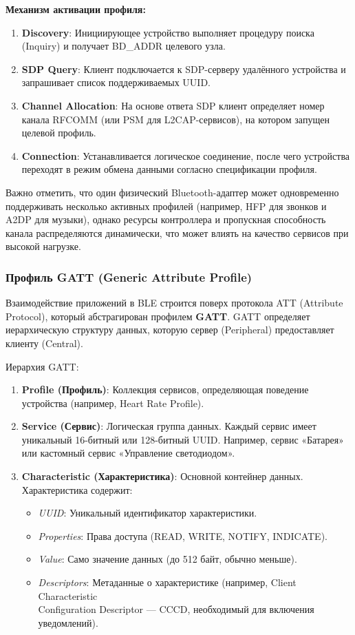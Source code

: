 \textbf{Механизм активации профиля:}
\begin{enumerate}[nosep]
    \item \textbf{Discovery}: Инициирующее устройство выполняет процедуру поиска (Inquiry) и получает BD\_ADDR целевого узла.
    \item \textbf{SDP Query}: Клиент подключается к SDP-серверу удалённого устройства и запрашивает список поддерживаемых UUID.
    \item \textbf{Channel Allocation}: На основе ответа SDP клиент определяет номер канала RFCOMM (или PSM для L2CAP-сервисов), на котором запущен целевой профиль.
    \item \textbf{Connection}: Устанавливается логическое соединение, после чего устройства переходят в режим обмена данными согласно спецификации профиля.
\end{enumerate}

Важно отметить, что один физический Bluetooth-адаптер может одновременно поддерживать несколько активных профилей (например, HFP для звонков и A2DP для музыки), однако ресурсы контроллера и пропускная способность канала распределяются динамически, что может влиять на качество сервисов при высокой нагрузке.

\subsubsection{Профиль GATT (Generic Attribute Profile)}
Взаимодействие приложений в BLE строится поверх протокола ATT (Attribute Protocol), который абстрагирован профилем \textbf{GATT}. GATT определяет иерархическую структуру данных, которую сервер (Peripheral) предоставляет клиенту (Central).

Иерархия GATT:
\begin{enumerate}[nosep]
    \item \textbf{Profile (Профиль)}: Коллекция сервисов, определяющая поведение устройства (например, Heart Rate Profile).
    \item \textbf{Service (Сервис)}: Логическая группа данных. Каждый сервис имеет уникальный 16-битный или 128-битный UUID. Например, сервис «Батарея» или кастомный сервис «Управление светодиодом».
    \item \textbf{Characteristic (Характеристика)}: Основной контейнер данных. Характеристика содержит:
    \begin{itemize}[nosep]
        \item \textit{UUID}: Уникальный идентификатор характеристики.
        \item \textit{Properties}: Права доступа (READ, WRITE, NOTIFY, INDICATE).
        \item \textit{Value}: Само значение данных (до 512 байт, обычно меньше).
        \item \textit{Descriptors}: Метаданные о характеристике (например, Client Characteristic \\  Configuration Descriptor — CCCD, необходимый для включения уведомлений).
    \end{itemize}
\end{enumerate}

